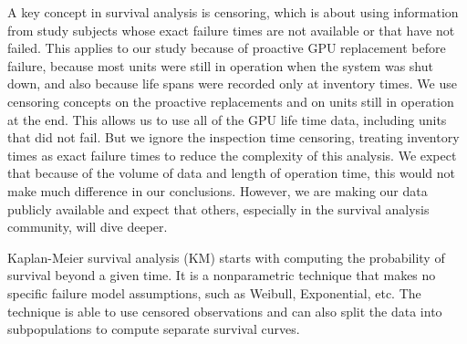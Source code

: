 A key concept in survival analysis is censoring, which is about using
information from study subjects whose exact failure times are not
available or that have not failed. This applies to our study because
of proactive GPU replacement before failure, because most units were
still in operation when the system was shut down, and also because
life spans were recorded only at inventory times. We use censoring
concepts on the proactive replacements and on units still in operation at
the end. This allows us to use all of the GPU life time data,
including units that did not fail. But we ignore the inspection time
censoring, treating inventory times as exact failure times to reduce
the complexity of this analysis. We expect that because of the volume
of data and length of operation time, this would not make much
difference in our conclusions. However, we are making our data
publicly available and expect that others, especially in the survival
analysis community, will dive deeper.

Kaplan-Meier survival analysis (KM) starts with computing the
probability of survival beyond a given time. It is a nonparametric
technique that makes no specific failure model assumptions, such as
Weibull, Exponential, etc. The technique is able to use censored
observations and can also split the data into subpopulations to
compute separate survival curves.

